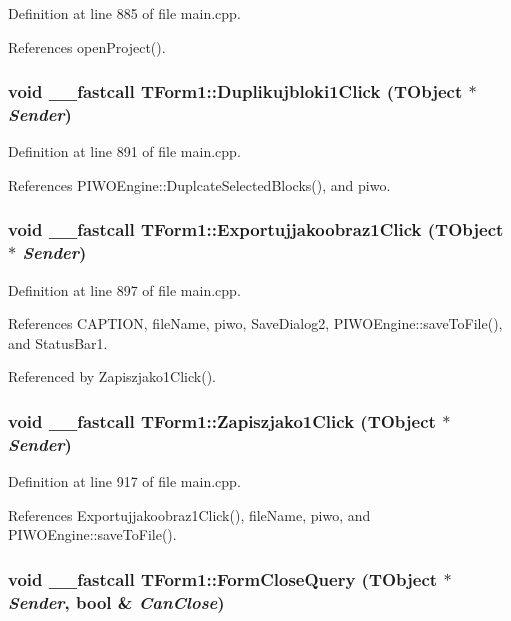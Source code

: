 Definition at line 885 of file main.cpp.

References openProject().\hypertarget{classTForm1_905eccb6be3dfda63ebceb962004286f}{
\subsubsection[Duplikujbloki1Click]{\setlength{\rightskip}{0pt plus 5cm}void \_\-\_\-fastcall TForm1::Duplikujbloki1Click (TObject $\ast$ {\em Sender})}}
\label{classTForm1_905eccb6be3dfda63ebceb962004286f}




Definition at line 891 of file main.cpp.

References PIWOEngine::DuplcateSelectedBlocks(), and piwo.\hypertarget{classTForm1_f8d02d580dfa34c21232b663bac20e69}{
\subsubsection[Exportujjakoobraz1Click]{\setlength{\rightskip}{0pt plus 5cm}void \_\-\_\-fastcall TForm1::Exportujjakoobraz1Click (TObject $\ast$ {\em Sender})}}
\label{classTForm1_f8d02d580dfa34c21232b663bac20e69}




Definition at line 897 of file main.cpp.

References CAPTION, fileName, piwo, SaveDialog2, PIWOEngine::saveToFile(), and StatusBar1.

Referenced by Zapiszjako1Click().\hypertarget{classTForm1_892e5a861ee39447c901bda936774a66}{
\subsubsection[Zapiszjako1Click]{\setlength{\rightskip}{0pt plus 5cm}void \_\-\_\-fastcall TForm1::Zapiszjako1Click (TObject $\ast$ {\em Sender})}}
\label{classTForm1_892e5a861ee39447c901bda936774a66}




Definition at line 917 of file main.cpp.

References Exportujjakoobraz1Click(), fileName, piwo, and PIWOEngine::saveToFile().\hypertarget{classTForm1_f3fc2edfe6864f1204a491d88a160202}{
\subsubsection[FormCloseQuery]{\setlength{\rightskip}{0pt plus 5cm}void \_\-\_\-fastcall TForm1::FormCloseQuery (TObject $\ast$ {\em Sender}, \/  bool \& {\em CanClose})}}
\label{classTForm1_f3fc2edfe6864f1204a491d88a160202}





